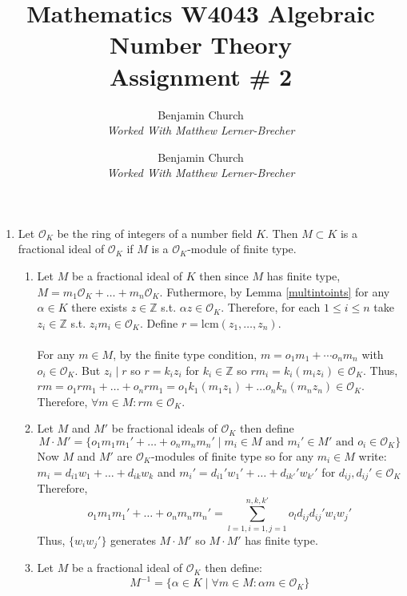 \documentclass[12pt]{extarticle}
\author{Benjamin Church \\ \textit{Worked With Matthew Lerner-Brecher} }
\newcommand{\divides}{\mid}
\newcommand{\Z}{\mathbb{Z}}
\newcommand{\ints}[1]{\mathcal{O}_{#1}}
\newcommand{\atitle}[1]{\title{%
	\large \textbf{Mathematics W4043 Algebraic Number Theory
	\\ Assignment \# #1} \vspace{-2ex}}
\author{Benjamin Church \\ \textit{Worked With Matthew Lerner-Brecher} }
\maketitle}
\begin{document}
\atitle{2}
 
\begin{enumerate}
\item Let $\ints{K}$ be the ring of integers of a number field $K$. Then $M \subset K$ is a fractional ideal of $\ints{K}$ if $M$ is a $\ints{K}$-module of finite type. 
\begin{enumerate}
\item Let $M$ be a fractional ideal of $K$ then since $M$ has finite type, $M = m_1 \ints{K} + \dots + m_n \ints{K}$. Futhermore, by Lemma \ref{multintoints} for any $\alpha \in K$ there exists $z \in \Z$ s.t. $\alpha z \in \ints{K}$. Therefore, for each $1 \le i \le n$ take $z_i \in \Z$ s.t. $z_i m_i \in \ints{K}$. Define $r = \mathrm{lcm}(z_1, \dots, z_n)$. \\ \\ 

For any $m \in M$, by the finite type condition, $m = o_1 m_1 + \cdots o_n m_n$ with $o_i \in \ints{K}$. But $z_i \divides r$ so $r = k_i z_i$ for $k_i \in \Z$ so $rm_i = k_i (m_i z_i) \in \ints{K}$. Thus, $rm = o_1 r m_1 + \dots + o_n r m_1 = o_1 k_1 (m_1 z_1) + \dots o_n k_n (m_n z_n) \in \ints{K}$. Therefore, $\forall m \in M : rm \in \ints{K}$.

\item Let $M$ and $M'$ be fractional ideals of $\ints{K}$ then define \[M \cdot M' = \{o_1 m_1 m_1' + \dots + o_n m_n m_n' \mid m_i \in M \text{ and } m_i' \in M' \text{ and } o_i \in \ints{K} \}\]
Now $M$ and $M'$ are $\ints{K}$-modules of finite type so for any $m_i \in M$ write: \\ $m_i = d_{i1} w_{1} + \dots + d_{ik} w_{k}$ and $m_i' = d_{i1}' w_{1}' + \dots + d_{ik'}' w_{k'}'$ for $d_{ij}, d_{ij}' \in \ints{K}$ Therefore, \[o_1 m_1 m_1' + \dots + o_n m_n m_n' = \sum_{l = 1, i = 1, j = 1}^{n, k, k'} o_l d_{ij} d_{ij}' w_i w_j'\] 
Thus, $\{w_i w_j'\}$ generates $M \cdot M'$ so $M \cdot M'$ has finite type.  

\item Let $M$ be a fractional ideal of $\ints{K}$ then define: \[M^{-1} = \{ \alpha \in K \mid \forall m \in M : \alpha m \in \ints{K} \} \]


\end{enumerate}
\end{enumerate}
\end{document}
